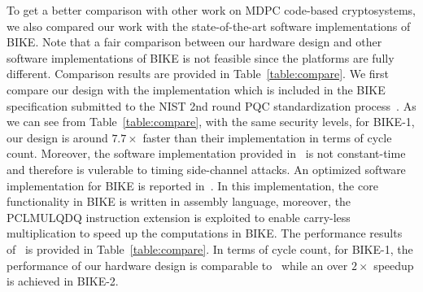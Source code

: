 \documentclass[runningheads]{llncs}
\begin{document}
To get a better comparison with other work on MDPC code-based cryptosystems,
we also compared our work with the state-of-the-art software implementations of BIKE.
Note that a fair comparison between our hardware design and other software implementations 
of BIKE is not feasible since the platforms are fully different.  
Comparison results are provided in Table~\ref{table:compare}.
We first compare our design with the implementation 
which is included in the BIKE specification
submitted to the NIST 2nd round PQC standardization process~\cite{aragon2017bike}.
As we can see from Table~\ref{table:compare}, with the same security levels,
for BIKE-1, our design is around $7.7\times$ faster than their implementation 
in terms of cycle count.
Moreover, the software implementation provided in~\cite{aragon2017bike} is not constant-time and
therefore is vulerable to timing side-channel attacks. 
An optimized software implementation for BIKE is reported in~\cite{drucker2017toolbox}. 
In this implementation, 
the core functionality in BIKE is written in assembly language,
moreover, the PCLMULQDQ instruction extension is exploited 
to enable carry-less multiplication to speed up
the computations in BIKE. 
The performance results of~\cite{drucker2017toolbox}
is provided in Table~\ref{table:compare}.
In terms of cycle count, for BIKE-1, the performance of our hardware design is
comparable to~\cite{drucker2017toolbox} while an over $2\times$
speedup is achieved in BIKE-2. 
\end{document}
